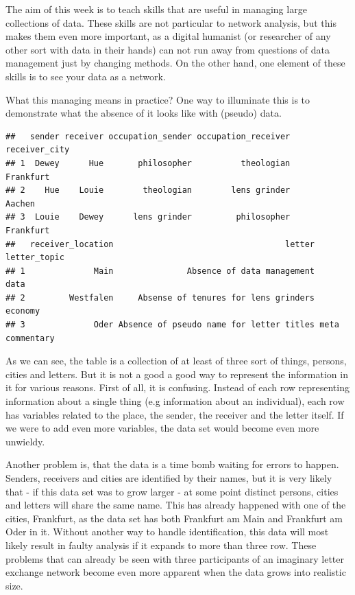 \documentclass[
]{book}
\begin{document}
The aim of this week is to teach skills that are useful in managing large collections of data. These skills are not particular to
network analysis, but this makes them even more important, as a digital humanist (or researcher of any other sort with data in their hands) can not run away from questions of data management just by changing methods. On the other hand, one element of these skills is to see your data as a network.

What this managing means in practice? One way to illuminate this is to demonstrate what the absence of it looks like with (pseudo) data.

\begin{verbatim}
##   sender receiver occupation_sender occupation_receiver receiver_city
## 1  Dewey      Hue       philosopher          theologian     Frankfurt
## 2    Hue    Louie        theologian        lens grinder        Aachen
## 3  Louie    Dewey      lens grinder         philosopher     Frankfurt
##   receiver_location                                   letter    letter_topic
## 1              Main               Absence of data management            data
## 2         Westfalen     Absense of tenures for lens grinders         economy
## 3              Oder Absence of pseudo name for letter titles meta commentary
\end{verbatim}

As we can see, the table is a collection of at least of three sort of things, persons, cities and letters. But it is not a good
a good way to represent the information in it for various reasons. First of all, it is confusing. Instead of each row representing
information about a single thing (e.g information about an individual), each row has variables related to the place, the sender, the receiver and the letter itself. If we were to add even more variables, the data set would become even more unwieldy.

Another problem is, that the data is a time bomb waiting for errors to happen. Senders, receivers and cities are identified by their names,
but it is very likely that - if this data set was to grow larger - at some point distinct persons, cities and letters will share the same name. This has already happened with one of the cities, Frankfurt, as the data set has both Frankfurt am Main and Frankfurt am Oder in it.
Without another way to handle identification, this data will most likely result in faulty analysis if it expands to more than three row. These problems that can already be seen with three participants of an imaginary letter exchange network become even more
apparent when the data grows into realistic size.
\end{document}
